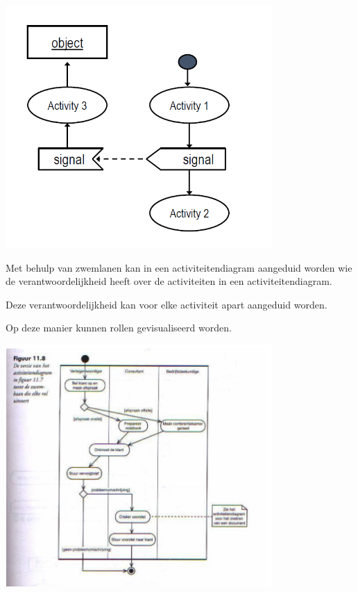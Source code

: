 \begin{center}
\includegraphics[width=4in]{img/signals}%
\end{center}


Met behulp van zwemlanen kan in een activiteitendiagram aangeduid worden wie de verantwoordelijkheid heeft over de activiteiten in een activiteitendiagram. 

Deze verantwoordelijkheid kan voor elke activiteit apart aangeduid worden. 

Op deze manier kunnen rollen gevisualiseerd worden.


\begin{center}
\includegraphics[width=4in]{img/swimlanes}%
\end{center}

